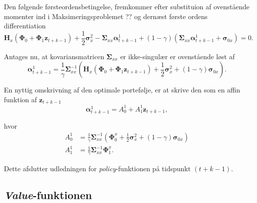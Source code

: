 \documentclass[
  a4paper,
  oneside]{memoir}
\begin{document}
Den følgende førsteordensbetingelse, fremkommer efter substituion af ovenstående momenter ind i Maksimeringsproblemet ?? og dernæst første ordens differentiation
\[\bm{H}_x\left(\bm{\Phi}_0 +\bm{\Phi}_1\bm{z}_{t+k-1}\right)+\frac{1}{2}\bm{\sigma}_x^2 - \bm{\Sigma}_{xx} \bm{\alpha}_{t+k-1}^{1}+\left(1-\gamma\right) \left(\bm{\Sigma}_{xx}\bm{\alpha}_{t+k-1}^{1}+\bm{\sigma}_{0x}\right)=0.\]

Antages nu, at kovariansmatricen \(\bm{\Sigma}_{xx}\) er ikke-singulær er ovenstående løst af
\[\bm{\alpha}_{t+k-1}^{1}=\frac{1}{\gamma}\bm{\Sigma}_{xx}^{-1}\left(\bm{H}_x(\bm{\Phi}_0 +\bm{\Phi}_1\bm{z}_{t+k-1})+\frac{1}{2}\bm{\sigma}_x^2+(1-\gamma) \bm{\sigma}_{0x}\right).\]

En nyttig omskrivning af den optimale portefølje, er at skrive den som en affin funktion af \(\bm{z}_{t+k-1}\)
\begin{equation}
\bm{\alpha}_{t+k-1}^{1} = A_0^1 + A_1^1\bm{z}_{t+k-1}, \label{eq:pol1p}
\end{equation}

hvor
\begin{align*}
A_0^1&=\frac{1}{\gamma} \bm{\Sigma}_{xx}^{-1}\left(\bm{\Phi}_0^x + \frac{1}{2}\bm{\sigma}_x^2+(1-\gamma)  \bm{\sigma}_{0x}\right)\\
A_1^1&=\frac{1}{\gamma} \bm{\Sigma}_{xx}^{-1}\bm{\Phi}_1^x.
\end{align*}

Dette afslutter udledningen for \emph{policy}-funktionen på tidspunkt \((t+k-1)\).

\hypertarget{value-funktionen}{%
\subsection{\texorpdfstring{\emph{Value}-funktionen}{Value-funktionen}}\label{value-funktionen}}
\end{document}
